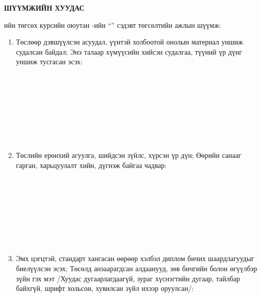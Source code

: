 \begin{titlepage}
\pagecolor{white}
\begin{center}

\textbf{{\Large ШҮҮМЖИЙН ХУУДАС}}\\[1cm]

\end{center}

\normalsize

\deptname{}ийн төгсөх курсийн оюутан \shortname-ийн ``\ttitle'' сэдэвт төгсөлтийн ажлын шүүмж:

\begin{enumerate}
\item Төслөөр дэвшүүлсэн асуудал, үүнтэй холбоотой онолын материал уншиж судалсан байдал; Энэ талаар хүмүүсийн хийсэн судалгаа, түүний үр дүнг уншиж тусгасан эсэх:
\begin{center}
\dotfill \\[0.1cm]
\dotfill \\[0.1cm]
\dotfill \\[0.1cm]
\dotfill \\[0.1cm]
\dotfill \\[0.1cm]
\dotfill \\[0.1cm]

\dotfill \\[0.4cm]
\end{center}

\item Төслийн ерөнхий агуулга, шийдсэн зүйлс, хүрсэн үр дүн; Өөрийн санааг гарган, харьцуулалт хийн, дүгнэж байгаа чадвар:
\begin{center}
\dotfill \\[0.1cm]
\dotfill \\[0.1cm]
\dotfill \\[0.1cm]
\dotfill \\[0.1cm]
\dotfill \\[0.1cm]
\dotfill \\[0.1cm]
\dotfill \\[0.4cm]
\end{center}

\item Эмх цэгцтэй, стандарт хангасан өөрөөр хэлбэл диплом бичих шаардлагуудыг биелүүлсэн эсэх; Төсөлд анзаарагдсан алдаанууд, зөв бичгийн болон өгүүлбэр зүйн гэх мэт /Хуудас дугаарлагдаагүй, зураг хүснэгтийн дугаар, тайлбар байхгүй, шрифт хольсон, хувилсан зүйл ихээр оруулсан/:
\begin{center}
\dotfill \\[0.1cm]
\dotfill \\[0.1cm]
\dotfill \\[0.1cm]
\dotfill \\[0.1cm]
\dotfill \\[0.1cm]
\dotfill \\[0.4cm]
\end{center}


\end{enumerate}
\end{titlepage}
